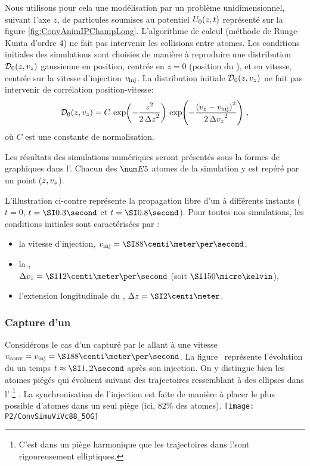 Nous utilisons pour cela une modélisation par un problème unidimensionnel, suivant l'axe $z$, de particules soumises au potentiel ${U_{0}}(z,t)$ représenté sur la figure \vref{fig:ConvAnimIPChampLong}. L'algorithme de calcul (méthode de Runge-Kunta d'ordre 4) ne fait pas intervenir les collisions entre atomes.
Les conditions initiales des simulations sont choisies de manière à reproduire une distribution $\mathcal{D}_0(z,{v_{ z}})$ gaussienne en position, centrée en $z=0$ (position du \pmo), et en vitesse, centrée sur la vitesse d'injection $v_{{\rm {inj}}}$. La distribution initiale $\mathcal{D}_0(z,{v_{ z}})$ ne fait pas intervenir de corrélation position-vitesse:
\begin{equation}
	\Distribini(z,\vz) = C
	\, \Expo{-\dfrac{z^2}{2\,\Dzini^2}}
	\, \Expo{-\dfrac{\left(\vz-\vinj\right)^2}{2\,\deltavjet^2}}
	\virguleformule
	\label{eq:distribSimu}
\end{equation}
où $C$ est une constante de normalisation.

\noindent Les résultats des simulations numériques seront présentés sous la formes de graphiques dans l'\edpup. Chacun des $\val{E5}$ atomes de la simulation y est repéré par un point ($z,{v_{ z}}$). 

\noindent L'illustration ci-contre représente la propagation libre d'un \pat à différents instants ($t=0$, $t=\seconde{0.3}$ et $t=\seconde{0.8}$). Pour toutes nos simulations, les conditions initiales sont caractérisées par : 
\begin{itemize}
	\item la vitesse d'injection, $\vinj=\cmps{88}$, 
	\item la \dispvitlong, \\$\deltavjet=\cmps{12}$ (soit $\microK{150}$), 
	\item l'extension longitudinale du \p, $\Dzini=\cm{2}$.
\end{itemize}


\subsubsection{Capture d'un \pat }
Considérons le cas d'un \pat capturé par le \tpIP allant à une vitesse $\vconv=\vinj=\cmps{88}$. La figure~ représente l'évolution du \p un temps $t\approx\seconde{1,2}$ après son injection. On y distingue bien les atomes piégés qui évoluent suivant des trajectoires ressemblant à des ellipses dans l'\edpup%
%
\footnote{C'est dans un piège harmonique que les trajectoires dans l'\edp sont rigoureusement elliptiques.}%
.
La synchronisation de l'injection est faite de manière à placer le plus possible d'atomes dans un seul piège (ici, $82\%$ des atomes). 
%
\bfighs
\texttt{[image: P2/ConvSimuViVc88\_50G]}
\label{fig:ConvSimuViVc88_50G}
\efigh

